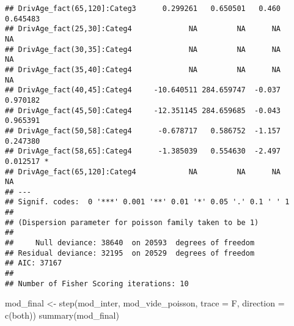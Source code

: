 \documentclass[
]{article}
\newenvironment{Shaded}{\begin{snugshade}}{\end{snugshade}}
\newcommand{\AttributeTok}[1]{\textcolor[rgb]{0.77,0.63,0.00}{#1}}
\newcommand{\FunctionTok}[1]{\textcolor[rgb]{0.00,0.00,0.00}{#1}}
\newcommand{\NormalTok}[1]{#1}
\newcommand{\OtherTok}[1]{\textcolor[rgb]{0.56,0.35,0.01}{#1}}
\newcommand{\StringTok}[1]{\textcolor[rgb]{0.31,0.60,0.02}{#1}}
\begin{document}
\begin{verbatim}
## DrivAge_fact(65,120]:Categ3      0.299261   0.650501   0.460 0.645483    
## DrivAge_fact(25,30]:Categ4             NA         NA      NA       NA    
## DrivAge_fact(30,35]:Categ4             NA         NA      NA       NA    
## DrivAge_fact(35,40]:Categ4             NA         NA      NA       NA    
## DrivAge_fact(40,45]:Categ4     -10.640511 284.659747  -0.037 0.970182    
## DrivAge_fact(45,50]:Categ4     -12.351145 284.659685  -0.043 0.965391    
## DrivAge_fact(50,58]:Categ4      -0.678717   0.586752  -1.157 0.247380    
## DrivAge_fact(58,65]:Categ4      -1.385039   0.554630  -2.497 0.012517 *  
## DrivAge_fact(65,120]:Categ4            NA         NA      NA       NA    
## ---
## Signif. codes:  0 '***' 0.001 '**' 0.01 '*' 0.05 '.' 0.1 ' ' 1
## 
## (Dispersion parameter for poisson family taken to be 1)
## 
##     Null deviance: 38640  on 20593  degrees of freedom
## Residual deviance: 32195  on 20529  degrees of freedom
## AIC: 37167
## 
## Number of Fisher Scoring iterations: 10
\end{verbatim}

\begin{Shaded}
\begin{Highlighting}[]
\NormalTok{mod\_final }\OtherTok{\textless{}{-}} \FunctionTok{step}\NormalTok{(mod\_inter, mod\_vide\_poisson, }\AttributeTok{trace =}\NormalTok{ F, }\AttributeTok{direction =} \FunctionTok{c}\NormalTok{(}\StringTok{\textquotesingle{}both\textquotesingle{}}\NormalTok{))}
\FunctionTok{summary}\NormalTok{(mod\_final)}
\end{Highlighting}
\end{Shaded}
\end{document}
